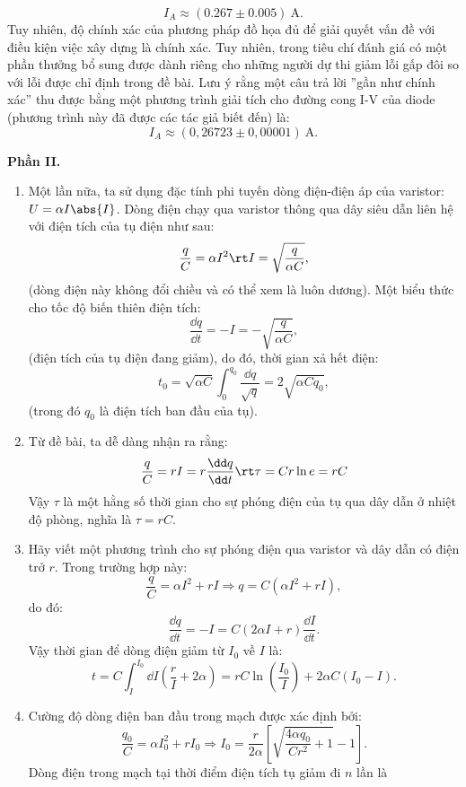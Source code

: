 \begin{loigiai}
\begin{enumerate}[1)]
\[I_A \approx (0.267 \pm 0.005)~\mathrm{A}.\]
Tuy nhiên, độ chính xác của phương pháp đồ họa đủ để giải quyết vấn đề với điều kiện việc xây dựng là chính xác. Tuy nhiên, trong tiêu chí đánh giá có một phần thưởng bổ sung được dành riêng cho những người dự thi giảm lỗi gấp đôi so với lỗi được chỉ định trong đề bài. Lưu ý rằng một câu trả lời ''gần như chính xác'' thu được bằng một phương trình giải tích cho đường cong I-V của diode (phương trình này đã được các tác giả biết đến) là:
\[I_A \approx (0,26723 \pm 0,00001) ~\mathrm{A}.\]
\end{enumerate}
\begin{center}
    \bf Phần II.
\end{center}
\begin{enumerate}[1)]
    \item Một lần nữa, ta sử dụng đặc tính phi tuyến dòng điện-điện áp của varistor: $U = \alpha I\abs{I}$. Dòng điện chạy qua varistor thông qua dây siêu dẫn liên hệ với điện tích của tụ điện như sau:
    \[\dfrac{q}{C} = \alpha I^2 \rt I=\sqrt{\dfrac{q}{\alpha C}},\]
    (dòng điện này không đổi chiều và có thể xem là luôn dương). Một biểu thức cho tốc độ biến thiên điện tích:
    \[\dfrac{\dd q}{\dd t} = -I = -\sqrt{\dfrac{q}{\alpha C}},\]
    (điện tích của tụ điện đang giảm), do đó, thời gian xả hết điện: 
    \[t_{0} = \sqrt{\alpha C} \int_{0}^{q_{0}} \dfrac{\dd q}{\sqrt{q}}=2 \sqrt{\alpha C q_{0}},\]
    (trong đó $q_0$ là điện tích ban đầu của tụ). 
    \item Từ đề bài, ta dễ dàng nhận ra rằng:
    \[\dfrac{q}{C} = rI = r\dfrac{\dd q}{\dd t} \rt \tau = Cr \ln{e} = rC\]
    Vậy $\tau$ là một hằng số thời gian cho sự phóng điện của tụ qua dây dẫn ở nhiệt độ phòng, nghĩa là $\tau = rC$.
    \item Hãy viết một phương trình cho sự phóng điện qua varistor và dây dẫn có điện trở $r$. Trong trường hợp này:
    \[\dfrac{q}{C} = \alpha I^{2}+r I \Rightarrow q = C\left(\alpha I^{2}+r I\right),\]
    do đó:
    \[\dfrac{\dd q}{\dd t} = -I = C(2 \alpha I+r) \dfrac{\dd I}{\dd t}.\]
    Vậy thời gian để  dòng điện giảm từ $I_0$ về $I$ là:
    \[t = C \int_{I}^{I_{0}} \dd I\left(\dfrac{r}{I}+2 \alpha\right)=r C \ln \left(\dfrac{I_{0}}{I}\right)+2 \alpha C\left(I_{0}-I\right).\]
    \item Cường độ dòng điện ban đầu trong mạch được xác định bởi:
    \[\dfrac{q_{0}}{C} = \alpha I_{0}^{2}+r I_{0} \Rightarrow I_{0} = \dfrac{r}{2 \alpha}\left[\sqrt{\dfrac{4 \alpha q_{0}}{C r^{2}}+1}-1\right].\]
    Dòng điện trong mạch tại thời điểm điện tích tụ giảm đi $n$ lần là

\end{enumerate}
\end{loigiai}

